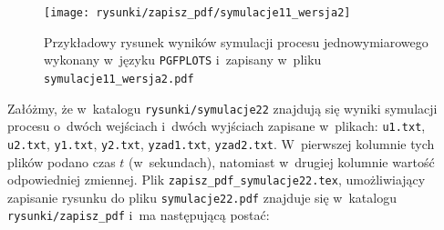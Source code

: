 \begin{figure}[tb]
\centering
\texttt{[image: rysunki/zapisz\_pdf/symulacje11\_wersja2]}
\caption{Przykładowy rysunek wyników symulacji procesu jednowymiarowego wykonany
w~języku \texttt{PGFPLOTS} i~zapisany w~pliku \texttt{symulacje11\_wersja2.pdf}}
\label{r_pgfplots_symulacje11_wersja2_pdf}
\end{figure}

Załóżmy, że w~katalogu \verb+rysunki/symulacje22+ znajdują się wyniki symulacji procesu o~dwóch wejściach i~dwóch wyjściach zapisane w~plikach: \verb+u1.txt+, \verb+u2.txt+, \verb+y1.txt+, \verb+y2.txt+, \verb+yzad1.txt+, \verb+yzad2.txt+. W~pierwszej kolumnie tych plików podano czas $t$ (w~sekundach), natomiast w~drugiej kolumnie wartość odpowiedniej zmiennej. Plik \verb+zapisz_pdf_symulacje22.tex+, umożliwiający zapisanie rysunku do pliku \verb+symulacje22.pdf+ znajduje się w~katalogu \verb+rysunki/zapisz_pdf+ i~ma następującą postać:
